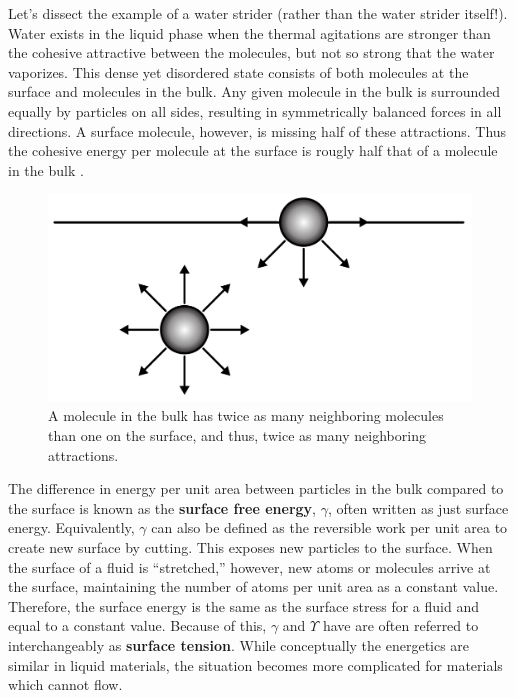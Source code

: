 Let's dissect the example of a water strider (rather than the water strider itself!). Water exists in the liquid phase when the thermal agitations are stronger than the cohesive attractive between the molecules, but not so strong that the water vaporizes. This dense yet disordered state consists of both molecules at the surface and molecules in the bulk. Any given molecule in the bulk is surrounded equally by particles on all sides, resulting in symmetrically balanced forces in all directions. A surface molecule, however, is missing half of these attractions. Thus the cohesive energy per molecule at the surface is rougly half that of a molecule in the bulk \cite{GennesPierre-Gillesde2003Cawp}. 
\begin{figure}
	\centering
	\includegraphics[width=0.7\linewidth]{Chapters/Figures/surface_energy_origin}
	\caption[Surface Free Energy]{A molecule in the bulk has twice as many neighboring molecules than one on the surface, and thus, twice as many neighboring attractions. }
	\label{fig:surfaceenergyorigin}
\end{figure}
The difference in energy per unit area between particles in the bulk compared to the surface is known as the \textbf{surface free energy}, $\gamma$, often written as just surface energy. Equivalently, $\gamma$ can also be defined as the reversible work per unit area to create new surface by cutting. This exposes new particles to the surface. When the surface of a fluid is ``stretched,'' however, new atoms or molecules arrive at the surface, maintaining the number of atoms per unit area as a constant value. Therefore, the surface energy is the same as the surface stress for a fluid and equal to a constant value. Because of this, $\gamma$ and $\Upsilon$ have are often referred to interchangeably as \textbf{surface tension}. While conceptually the energetics are similar in liquid materials, the situation becomes more complicated for materials which cannot flow.


